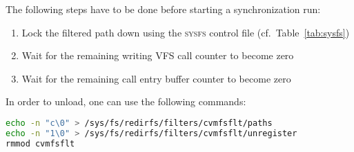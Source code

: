 The following steps have to be done before starting a synchronization run:
\begin{enumerate}
	\item Lock the filtered path down using the {\scshape sysfs} control file (cf.~Table~\ref{tab:sysfs})
	\item Wait for the remaining writing VFS call counter to become zero
	\item Wait for the remaining call entry buffer counter to become zero
\end{enumerate}

In order to unload, one can use the following commands:
\begin{lstlisting}[language=bash]
echo -n "c\0" > /sys/fs/redirfs/filters/cvmfsflt/paths
echo -n "1\0" > /sys/fs/redirfs/filters/cvmfsflt/unregister
rmmod cvmfsflt
\end{lstlisting}
